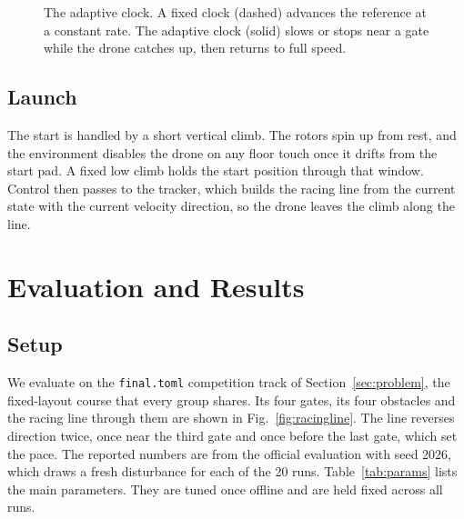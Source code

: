 \documentclass[conference]{IEEEtran}
\begin{document}
\begin{figure}[t]
\centering
{}
\caption{The adaptive clock. A fixed clock (dashed) advances the reference at a constant rate. The adaptive clock (solid) slows or stops near a gate while the drone catches up, then returns to full speed.}
\label{fig:clock}
\end{figure}

\subsection{Launch}
The start is handled by a short vertical climb. The rotors spin up from rest, and the environment disables the drone on any floor touch once it drifts from the start pad. A fixed low climb holds the start position through that window. Control then passes to the tracker, which builds the racing line from the current state with the current velocity direction, so the drone leaves the climb along the line.

\section{Evaluation and Results}
\label{sec:results}

\subsection{Setup}
We evaluate on the \texttt{final.toml} competition track of Section~\ref{sec:problem}, the fixed-layout course that every group shares. Its four gates, its four obstacles and the racing line through them are shown in Fig.~\ref{fig:racingline}. The line reverses direction twice, once near the third gate and once before the last gate, which set the pace. The reported numbers are from the official evaluation with seed 2026, which draws a fresh disturbance for each of the 20 runs. Table~\ref{tab:params} lists the main parameters. They are tuned once offline and are held fixed across all runs.
\end{document}
